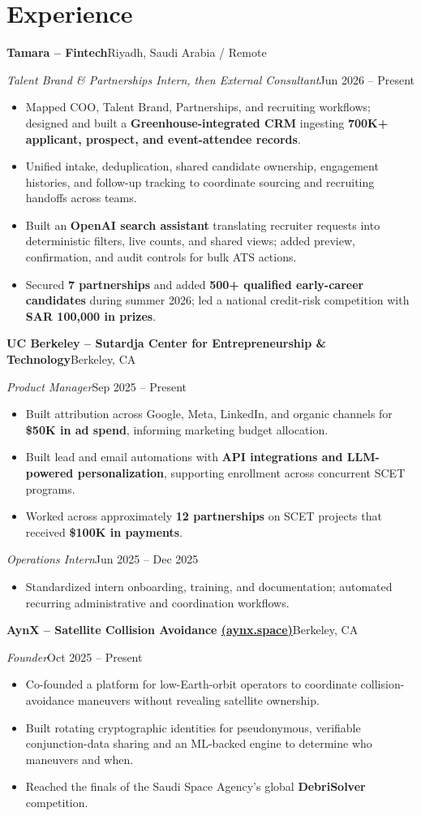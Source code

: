 \documentclass[a4paper,10pt]{article}
\newcommand{\entry}[4]{%
  \textbf{#1}\hfill #2\par
  \textit{#3}\hfill #4\par
}
\begin{document}
\section{Experience}
\entry{Tamara -- Fintech}{Riyadh, Saudi Arabia / Remote}
{Talent Brand \& Partnerships Intern, then External Consultant}{Jun 2026 -- Present}
\begin{itemize}
  \item Mapped COO, Talent Brand, Partnerships, and recruiting workflows; designed and built a \textbf{Greenhouse-integrated CRM} ingesting \textbf{700K+ applicant, prospect, and event-attendee records}.
  \item Unified intake, deduplication, shared candidate ownership, engagement histories, and follow-up tracking to coordinate sourcing and recruiting handoffs across teams.
  \item Built an \textbf{OpenAI search assistant} translating recruiter requests into deterministic filters, live counts, and shared views; added preview, confirmation, and audit controls for bulk ATS actions.
  \item Secured \textbf{7 partnerships} and added \textbf{500+ qualified early-career candidates} during summer 2026; led a national credit-risk competition with \textbf{SAR 100,000 in prizes}.
\end{itemize}
\entry{UC Berkeley -- Sutardja Center for Entrepreneurship \& Technology}{Berkeley, CA}
{Product Manager}{Sep 2025 -- Present}
\begin{itemize}
  \item Built attribution across Google, Meta, LinkedIn, and organic channels for \textbf{\$50K in ad spend}, informing marketing budget allocation.
  \item Built lead and email automations with \textbf{API integrations and LLM-powered personalization}, supporting enrollment across concurrent SCET programs.
  \item Worked across approximately \textbf{12 partnerships} on SCET projects that received \textbf{\$100K in payments}.
\end{itemize}
\textit{Operations Intern}\hfill Jun 2025 -- Dec 2025\par
\begin{itemize}
  \item Standardized intern onboarding, training, and documentation; automated recurring administrative and coordination workflows.
\end{itemize}
\entry{AynX -- Satellite Collision Avoidance \;\href{https://aynx.space}{(aynx.space)}}{Berkeley, CA}
{Founder}{Oct 2025 -- Present}
\begin{itemize}
  \item Co-founded a platform for low-Earth-orbit operators to coordinate collision-avoidance maneuvers without revealing satellite ownership.
  \item Built rotating cryptographic identities for pseudonymous, verifiable conjunction-data sharing and an ML-backed engine to determine who maneuvers and when.
  \item Reached the finals of the Saudi Space Agency's global \textbf{DebriSolver} competition.
\end{itemize}
\end{document}
